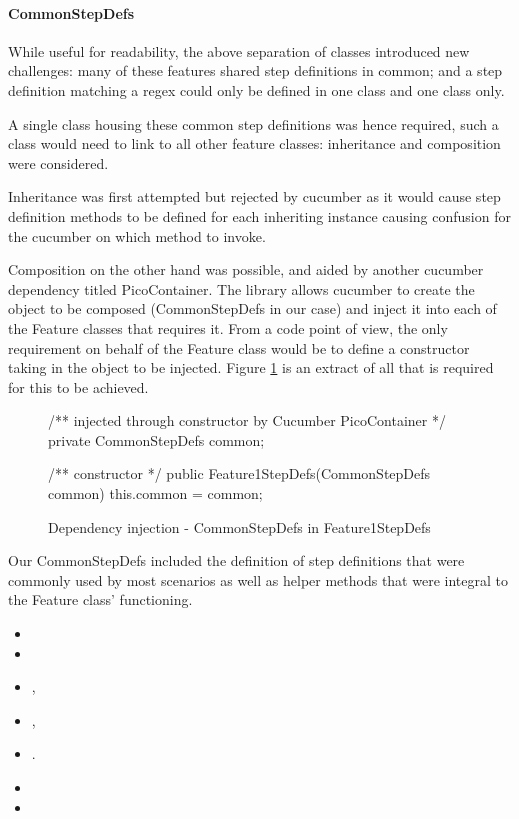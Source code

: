 \paragraph{CommonStepDefs} 
While useful for readability, the above separation of classes introduced new challenges: many of these features shared step definitions in common; and a step definition matching a regex could only be defined in one class and one class only.
\par 
A single class housing these common step definitions was hence required, such a class would need to link to all other feature classes: inheritance and composition were considered.
\par
Inheritance was first attempted but rejected by cucumber as it would cause step definition methods to be defined for each inheriting instance causing confusion for the cucumber on which method to invoke. 
\par
Composition on the other hand was possible, and aided by another cucumber dependency titled PicoContainer.  The library allows cucumber to create the object to be composed (CommonStepDefs in our case) and inject it into each of the Feature classes that requires it. From a code point of view, the only requirement on behalf of the Feature class would be to define a constructor taking in the object to be injected. Figure \ref{code:cucumber-piccontainer-di} is an extract of all that is required for this to be achieved. 
\begin{figure}[H]
\begin{javacode}
/** injected through constructor by Cucumber PicoContainer */
private CommonStepDefs common;

/** constructor */ 
public Feature1StepDefs(CommonStepDefs common) {
    this.common = common;
}
\end{javacode}
\caption{Dependency injection - CommonStepDefs in Feature1StepDefs}    
\label{code:cucumber-piccontainer-di}
\end{figure}
Our CommonStepDefs included the definition of step definitions that were commonly used by most scenarios as well as helper methods that were integral to the Feature class' functioning. 
\begin{itemize}
    \item {}
    \item {}
    \item {}, 
    \item {}, 
    \item {}.
    \item {}
    \item {}
\end{itemize}

